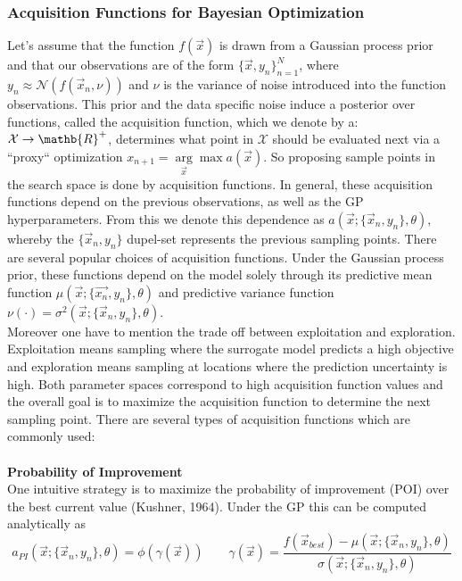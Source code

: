 \documentclass[12pt, a4paper]{article}
\begin{document}
\subsubsection{Acquisition Functions for Bayesian Optimization}
Let's assume that the function $f(\vec{x})$ is drawn from a Gaussian process prior and that our observations are of the form $\{\vec{x},y_n\}_{n=1}^N$, where $y_n \approx \mathcal{N}(f(\vec{x}_n,\nu))$ and $\nu$ is the variance of noise introduced into the function observations. 
This prior and the data specific noise induce a posterior over functions, called the acquisition function, which we denote by a: $\mathcal{X} \rightarrow \mathb{R}^{+}$, determines what point in $\mathcal{X}$ should be evaluated next via a ``proxy`` optimization $x_{n+1} = \underset{\vec{x}}\arg\max a(\vec{x})$. So proposing sample points in the search space is done by acquisition functions. In general, these acquisition functions depend on the previous observations, as well as the GP hyperparameters. From this we denote this dependence as $a(\vec{x};\{\vec{x}_n,y_n\},\theta)$, whereby the $\{\vec{x}_n,y_n\}$ dupel-set represents the previous sampling points.
There are several popular choices of acquisition functions. Under the Gaussian process prior, these functions depend on the model solely through its predictive mean function $\mu(\vec{x};\{\vec{x_n},y_n\},\theta)$ and predictive variance function $\nu(\cdot) = \sigma^2(\vec{x};\{\vec{x}_n, y_n\}, \theta)$.\\
Moreover one have to mention the trade off between exploitation and exploration. Exploitation means sampling where the surrogate model predicts a high objective and exploration means sampling at locations where the prediction uncertainty is high. Both parameter spaces correspond to high acquisition function values and the overall goal is to maximize the acquisition function to determine the next sampling point. There are several types of acquisition functions which are commonly used: \\ 
\\
\textbf{Probability of Improvement} \\
One intuitive strategy is to maximize the probability of improvement (POI) over the best current value (Kushner, 1964). Under the GP this can be computed analytically as 
\begin{equation}
    a_{PI}(\vec{x};\{\vec{x}_n ,y_n\},\theta) = \phi(\gamma(\vec{x}))
    \qquad 
    \gamma(\vec{x}) = \frac{f(\vec{x}_{best}) - \mu(\vec{x}; \{\vec{x}_n,y_n\},\theta)}{\sigma(\vec{x};\{\vec{x}_n,y_n\},\theta)}
\end{equation}
\end{document}
